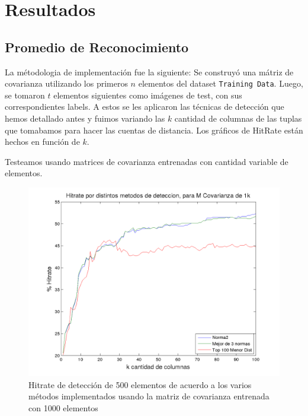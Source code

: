 \section{Resultados}


\subsection{Promedio de Reconocimiento}
La m\'etodologia de implementaci\'on fue la siguiente: Se construy\'o una 
m\'atriz de covarianza utilizando los primeros $n$ elementos del dataset 
\texttt{Training Data}. Luego, se tomaron $t$ elementos siguientes como im\'agenes 
de test, con sus correspondientes labels. A estos se les aplicaron las t\'ecnicas 
de detecci\'on que hemos detallado antes y fuimos variando las $k$ cantidad de 
columnas de las tuplas que tomabamos para hacer las cuentas de distancia. 
Los gr\'aficos de HitRate est\'an hechos en funci\'on de $k$.

Testeamos usando matrices de covarianza entrenadas con cantidad variable de elementos.
\def \hrwidth {500pt}

\begin{figure}[H]
\begin {center}
\includegraphics[width=\hrwidth]{plots/hitrate-1kcv.png}
\end {center}
\caption{Hitrate de detecci\'on de 500 elementos de acuerdo a los varios m\'etodos implementados
usando la matriz de covarianza entrenada con 1000 elementos}
\label{fig:HR1kcv}
\end{figure}

